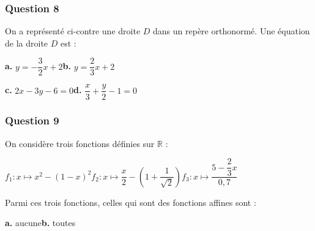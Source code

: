 \documentclass[10pt]{article}
\begin{document}
\subsubsection*{Question 8}

\begin{minipage}[t]{0.6\textwidth}
On a représenté ci-contre une droite $D$ dans un repère orthonormé. Une équation de la droite $D$ est :

\bigskip

\textbf{a.} $y = -\dfrac{3}{2}x + 2$\hfill \textbf{b.} $y = \dfrac{2}{3}x + 2$

\bigskip

\textbf{c.} $2x - 3y - 6 = 0$\hfill \textbf{d.} $\dfrac{x}{3} + \dfrac{y}{2} - 1 = 0$
\end{minipage}
\hfill
\begin{minipage}[t]{0.35\textwidth}
\vspace{0pt}
\begin{center}
\end{center}
\end{minipage}

\subsubsection*{Question 9}
On considère trois fonctions définies sur $\mathbb{R}$ :

$f_1 : x \mapsto x^2 - (1 - x)^2$\hfill $f_2 : x \mapsto \dfrac{x}{2} - \left(1 + \dfrac{1}{\sqrt{2}}\right)$\hfill $f_3 : x \mapsto \dfrac{5 - \dfrac{2}{3}x}{0,7}$

Parmi ces trois fonctions, celles qui sont des fonctions affines sont :

\textbf{a.} aucune\hfill \textbf{b.} toutes
\end{document}
